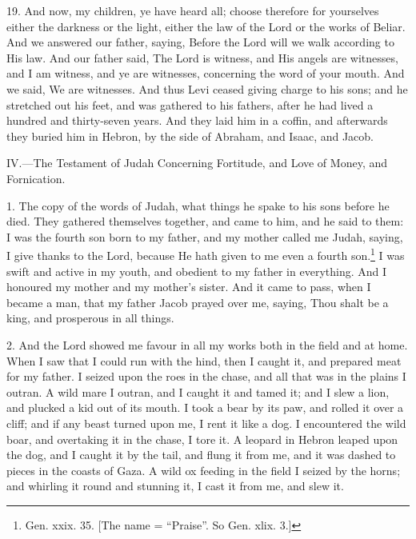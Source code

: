 19. And now, my children, ye have heard all; choose therefore for yourselves either the darkness or the light, either the law of the Lord or the works of Beliar. And we answered our father, saying, Before the Lord will we walk according to His law. And our father said, The Lord is witness, and His angels are witnesses, and I am witness, and ye are witnesses, concerning the word of your mouth. And we said, We are witnesses. And thus Levi ceased giving charge to his sons; and he stretched out his feet, and was gathered to his fathers, after he had lived a hundred and thirty-seven years. And they laid him in a coffin, and afterwards they buried him in Hebron, by the side of Abraham, and Isaac, and Jacob.


IV.—The Testament of Judah Concerning Fortitude, and Love of Money, and Fornication.

1. The copy of the words of Judah, what things he spake to his sons before he died. They gathered themselves together, and came to him, and he said to them: I was the fourth son born to my father, and my mother called me Judah, saying, I give thanks to the Lord, because He hath given to me even a fourth son.\footnote{Gen. xxix. 35. [The name = ``Praise''. So Gen. xlix. 3.]} I was swift and active in my youth, and obedient to my father in everything. And I honoured my mother and my mother’s sister. And it came to pass, when I became a man, that my father Jacob prayed over me, saying, Thou shalt be a king, and prosperous in all things.

2. And the Lord showed me favour in all my works both in the field and at home. When I saw that I could run with the hind, then I caught it, and prepared meat for my father. I seized upon the roes in the chase, and all that was in the plains I outran. A wild mare I outran, and I caught it and tamed it; and I slew a lion, and plucked a kid out of its mouth. I took a bear by its paw, and rolled it over a cliff; and if any beast turned upon me, I rent it like a dog. I encountered the wild boar, and overtaking it in the chase, I tore it. A leopard in Hebron leaped upon the dog, and I caught it by the tail, and flung it from me, and it was dashed to pieces in the coasts of Gaza. A wild ox feeding in the field I seized by the horns; and whirling it round and stunning it, I cast it from me, and slew it.


